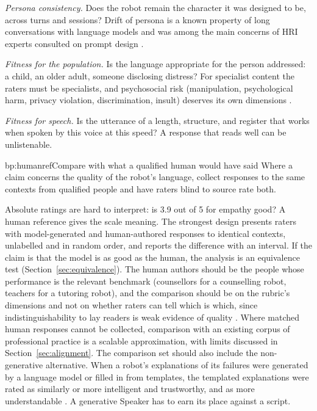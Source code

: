 \emph{Persona consistency.} Does the robot remain the character it was
designed to be, across turns and sessions? Drift of persona is a known
property of long conversations with language models and was among the main
concerns of HRI experts consulted on prompt design \cite{ashok2026why}.

\emph{Fitness for the population.} Is the language appropriate for the
person addressed: a child, an older adult, someone disclosing distress? For
specialist content the raters must be specialists, and psychosocial risk
(manipulation, psychological harm, privacy violation, discrimination, insult)
deserves its own dimensions \cite{luo2026dialogguard}.

\emph{Fitness for speech.} Is the utterance of a length, structure, and
register that works when spoken by this voice at this speed? A response
that reads well can be unlistenable.

\begin{practice}{bp:humanref}{Compare with what a qualified human would have said}
Where a claim concerns the quality of the robot's language, collect responses
to the same contexts from qualified people and have raters blind to source
rate both.
\end{practice}

Absolute ratings are hard to interpret: is 3.9 out of 5 for empathy good? A
human reference gives the scale meaning. The strongest design presents
raters with model-generated and human-authored responses to identical
contexts, unlabelled and in random order, and reports the difference with an
interval. If the claim is that the model is as good as the human, the
analysis is an equivalence test (Section~\ref{sec:equivalence}). The human
authors should be the people whose performance is the relevant benchmark
(counsellors for a counselling robot, teachers for a tutoring robot), and
the comparison should be on the rubric's dimensions and not on whether
raters can tell which is which, since indistinguishability to lay readers is
weak evidence of quality \cite{clark2021all}. Where matched human responses
cannot be collected, comparison with an existing corpus of professional
practice is a scalable approximation, with limits discussed in
Section~\ref{sec:alignment}. The comparison set should also include the
non-generative alternative. When a robot's explanations of its failures
were generated by a language model or filled in from templates, the
templated explanations were rated as similarly or more intelligent and
trustworthy, and as more understandable \cite{lemasurier2024templated}. A
generative Speaker has to earn its place against a script.


